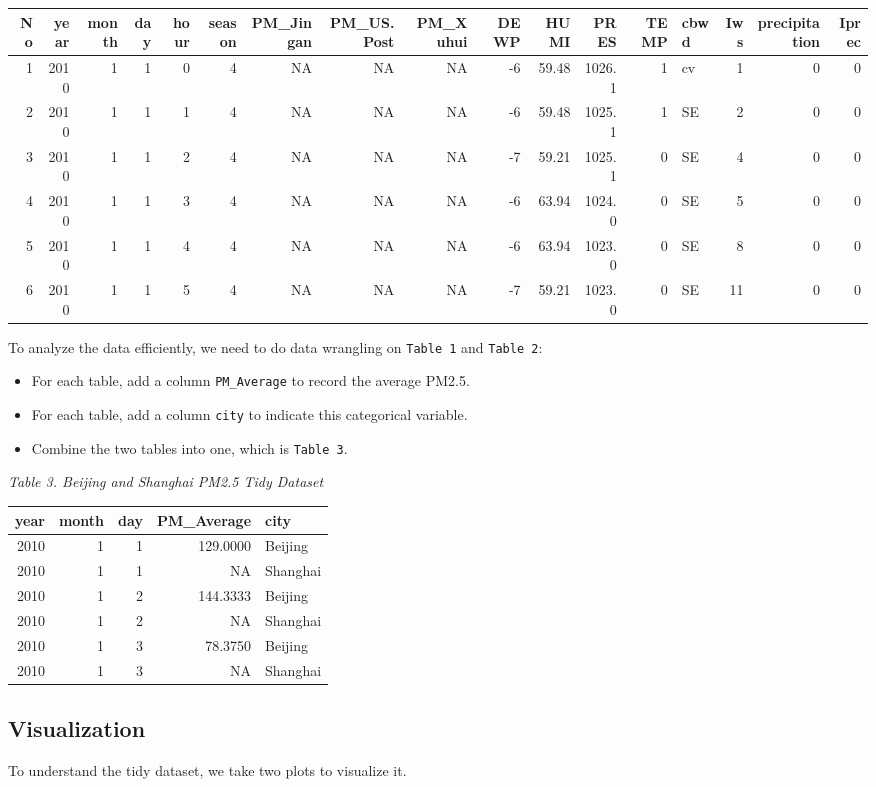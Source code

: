 \documentclass[]{article}
\begin{document}
\begin{longtable}[]{@{}rrrrrrrrrrrrrlrrr@{}}
\toprule
No & year & month & day & hour & season & PM\_Jingan & PM\_US.Post &
PM\_Xuhui & DEWP & HUMI & PRES & TEMP & cbwd & Iws & precipitation &
Iprec\tabularnewline
\midrule
\endhead
1 & 2010 & 1 & 1 & 0 & 4 & NA & NA & NA & -6 & 59.48 & 1026.1 & 1 & cv &
1 & 0 & 0\tabularnewline
2 & 2010 & 1 & 1 & 1 & 4 & NA & NA & NA & -6 & 59.48 & 1025.1 & 1 & SE &
2 & 0 & 0\tabularnewline
3 & 2010 & 1 & 1 & 2 & 4 & NA & NA & NA & -7 & 59.21 & 1025.1 & 0 & SE &
4 & 0 & 0\tabularnewline
4 & 2010 & 1 & 1 & 3 & 4 & NA & NA & NA & -6 & 63.94 & 1024.0 & 0 & SE &
5 & 0 & 0\tabularnewline
5 & 2010 & 1 & 1 & 4 & 4 & NA & NA & NA & -6 & 63.94 & 1023.0 & 0 & SE &
8 & 0 & 0\tabularnewline
6 & 2010 & 1 & 1 & 5 & 4 & NA & NA & NA & -7 & 59.21 & 1023.0 & 0 & SE &
11 & 0 & 0\tabularnewline
\bottomrule
\end{longtable}

To analyze the data efficiently, we need to do data wrangling on
\texttt{Table\ 1} and \texttt{Table\ 2}:

\begin{itemize}
\item
  For each table, add a column \texttt{PM\_Average} to record the
  average PM2.5.
\item
  For each table, add a column \texttt{city} to indicate this
  categorical variable.
\item
  Combine the two tables into one, which is \texttt{Table\ 3}.
\end{itemize}

\emph{Table 3. Beijing and Shanghai PM2.5 Tidy Dataset}

\begin{longtable}[]{@{}rrrrl@{}}
\toprule
year & month & day & PM\_Average & city\tabularnewline
\midrule
\endhead
2010 & 1 & 1 & 129.0000 & Beijing\tabularnewline
2010 & 1 & 1 & NA & Shanghai\tabularnewline
2010 & 1 & 2 & 144.3333 & Beijing\tabularnewline
2010 & 1 & 2 & NA & Shanghai\tabularnewline
2010 & 1 & 3 & 78.3750 & Beijing\tabularnewline
2010 & 1 & 3 & NA & Shanghai\tabularnewline
\bottomrule
\end{longtable}

\subsection{Visualization}\label{visualization}

To understand the tidy dataset, we take two plots to visualize it.
\end{document}
